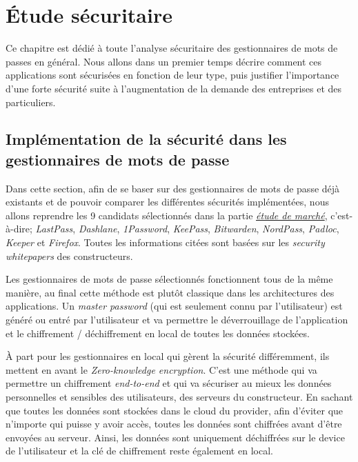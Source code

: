 
\chapter{Étude sécuritaire}
\label{ch:etude_secu}

Ce chapitre est dédié à toute l'analyse sécuritaire des gestionnaires de mots de passes en général. Nous allons dans un premier temps décrire comment ces applications sont sécurisées en fonction de leur type, puis justifier l'importance d'une forte sécurité suite à l'augmentation de la demande des entreprises et des particuliers.

\section{Implémentation de la sécurité dans les gestionnaires de mots de passe}

Dans cette section, afin de se baser sur des gestionnaires de mots de passe déjà existants et de pouvoir comparer les différentes sécurités implémentées, nous allons reprendre les 9 candidats sélectionnés dans la partie \hyperref[ch:etude_marche]{\textit{étude de marché}}, c'est-à-dire; \textit{LastPass}, \textit{Dashlane}, \textit{1Password}, \textit{KeePass}, \textit{Bitwarden}, \textit{NordPass}, \textit{Padloc}, \textit{Keeper} et \textit{Firefox}. Toutes les informations citées sont basées sur les \textit{security whitepapers} des constructeurs\cite{lastpasssecurity}\cite{dashlanesecurity}\cite{1passwordsecurity}\cite{keepasssecurity}\cite{bitwardensecurity}\cite{padlocsecurity}\cite{keepersecurity}.

Les gestionnaires de mots de passe sélectionnés fonctionnent tous de la même manière, au final cette méthode est plutôt classique dans les architectures des applications. Un \textit{master password} (qui est seulement connu par l'utilisateur) est généré ou entré par l'utilisateur et va permettre le déverrouillage de l'application et le chiffrement / déchiffrement en local de toutes les données stockées. 

À part pour les gestionnaires en local qui gèrent la sécurité différemment, ils mettent en avant le \textit{Zero-knowledge encryption}. C'est une méthode qui va permettre un chiffrement \textit{end-to-end} et qui va sécuriser au mieux les données personnelles et sensibles des utilisateurs, des serveurs du constructeur. En sachant que toutes les données sont stockées dans le cloud du provider, afin d'éviter que n'importe qui puisse y avoir accès, toutes les données sont chiffrées avant d'être envoyées au serveur. Ainsi, les données sont uniquement déchiffrées sur le device de l'utilisateur et la clé de chiffrement reste également en local.

